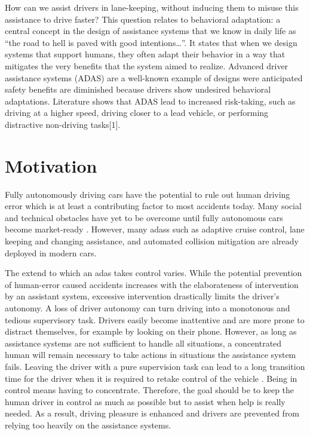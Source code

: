 How can we assist drivers in lane-keeping, without inducing them to misuse this assistance to drive faster? This question relates to behavioral adaptation: a central concept in the design of assistance systems that we know in daily life as “the road to hell is paved with good intentions…”. It states that when we design systems that support humans, they often adapt their behavior in a way that mitigates the very benefits that the system aimed to realize. Advanced driver assistance systems (ADAS) are a well-known example of designs were anticipated safety benefits are diminished because drivers show undesired behavioral adaptations. Literature shows that ADAS lead to increased risk-taking, such as driving at a higher speed, driving closer to a lead vehicle, or performing distractive non-driving tasks[1].

\fi

%
%


\section{Motivation}

Fully autonomously driving cars have the potential to rule out human driving error which is at least a contributing factor to most accidents today. Many social and technical obstacles have yet to be overcome until fully autonomous cars become market-ready \parencite{autonomous_driving_book}. However, many \glspl{adas} such as adaptive cruise control, lane keeping and changing assistance, and automated collision mitigation are already deployed in modern cars. 

The extend to which an \gls{adas} takes control varies. While the potential prevention of human-error caused accidents increases with the elaborateness of intervention by an assistant system, excessive intervention drastically limits the driver's autonomy. A loss of driver autonomy can turn driving into a monotonous and tedious supervisory task. Drivers easily become inattentive and are more prone to distract themselves, for example by looking on their phone. However, as long as assistance systems are not sufficient to handle all situations, a concentrated human will remain necessary to take actions in situations the assistance system fails. Leaving the driver with a pure supervision task can lead to a long transition time for the driver when it is required to retake control of the vehicle \parencite{shared_control}. Being in control means having to concentrate. Therefore, the goal should be to keep the human driver in control as much as possible but to assist when help is really needed. As a result, driving pleasure is enhanced and drivers are prevented from relying too heavily on the assistance systems.

